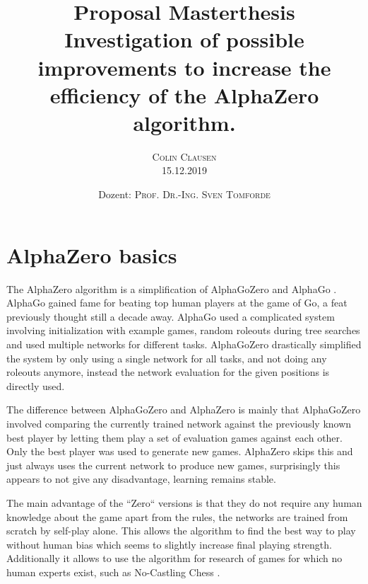\documentclass[12pt,onecolumn,oneside,titlepage]{article}
\begin{document}
\title{\bfseries {\Large Proposal Masterthesis}\\[2cm]
      Investigation of possible improvements to increase the efficiency of the AlphaZero algorithm.}

\author{\textsc{Colin Clausen}\\[1cm]
        15.12.2019\\[3cm]}

\date{Dozent: \textsc{Prof. Dr.-Ing. Sven Tomforde}}


\maketitle
\setcounter{tocdepth}{3}  %
\tableofcontents
\newpage

\section{AlphaZero basics}

The AlphaZero algorithm \cite{silver2018general} is a simplification of AlphaGoZero \cite{silver2017mastering} and AlphaGo \cite{silver2016mastering}. AlphaGo gained fame for beating top human players at the game of Go, a feat previously thought still a decade away.
AlphaGo used a complicated system involving initialization with example games, random roleouts during tree searches and used multiple networks for different tasks. AlphaGoZero drastically simplified the system by only using a single network for all tasks,
and not doing any roleouts anymore, instead the network evaluation for the given positions is directly used.

The difference between AlphaGoZero and AlphaZero is mainly that AlphaGoZero involved comparing the currently trained network against the previously known best player by letting them play a set of evaluation games against each other.
Only the best player was used to generate new games. AlphaZero skips this and just always uses the current network to produce new games, surprisingly this appears to not give any disadvantage, learning remains stable.

The main advantage of the ``Zero`` versions is that they do not require any human knowledge about the game apart from the rules, the networks are trained from scratch by self-play alone.
This allows the algorithm to find the best way to play without human bias which seems to slightly increase final playing strength.
Additionally it allows to use the algorithm for research of games for which no human experts exist, such as No-Castling Chess \cite{NoCastleChess}.
\end{document}
